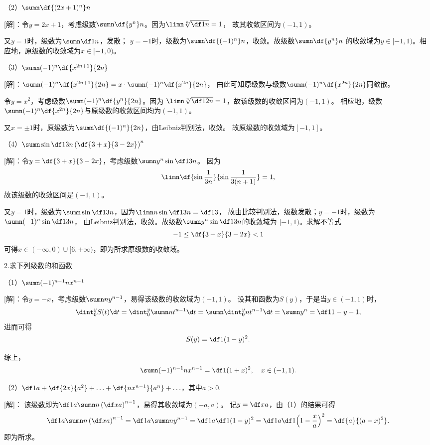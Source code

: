 （2）$\sumn\df{(2x+1)^n}n$

[解]：令$y=2x+1$，考虑级数$\sumn\df{y^n}n$。因为$\limn\sqrt[n]{\df1n}=1$，
故其收敛区间为$(-1,1)$。

又$y=1$时，级数为$\sumn\df1n$，发散；
$y=-1$时，级数为$\sumn\df{(-1)^n}n$，收敛。故级数$\sumn\df{y^n}n$
的收敛域为$y\in[-1,1)$。相应地，原级数的收敛域为$x\in[-1,0)$。

（3）$\sumn(-1)^n\df{x^{2n+1}}{2n}$

[解]：$\sumn(-1)^n\df{x^{2n+1}}{2n}=x\cdot\sumn(-1)^n\df{x^{2n}}{2n}$，
由此可知原级数与级数$\sumn(-1)^n\df{x^{2n}}{2n}$同敛散。

令$y=x^2$，考虑级数$\sumn(-1)^n\df{y^{n}}{2n}$。因为
$\limn\sqrt[n]{\df1{2n}}=1$，故该级数的收敛区间为$(-1,1)$。
相应地，级数$\sumn(-1)^n\df{x^{2n}}{2n}$与原级数的收敛区间均为$(-1,1)$。

又$x=\pm1$时，原级数为$\sumn\df{(-1)^n}{2n}$，由Leibniz判别法，收敛。
故原级数的收敛域为$[-1,1]$。

（4）$\sumn\sin\df 1 {3n}\left(\df{3+x}{3-2x}\right)^n$

[解]：令$y=\df{3+x}{3-2x}$，考虑级数$\sumn y^n\sin\df1{3n}$。
因为
$$\limn\df{\sin\frac1{3n}}{\sin\frac1{3(n+1)}}=1,$$
故该级数的收敛区间是$(-1,1)$。

又$y=1$时，级数为$\sumn\sin\df1{3n}$，因为$\limn n\sin\df1{3n}=\df13$，
故由比较判别法，级数发散；$y=-1$时，级数为$\sumn(-1)^n\sin\df1{3n}$，
由Leibniz判别法，收敛。故级数$\sumn y^n\sin\df1{3n}$的收敛域为
$[-1,1)$。求解不等式
$$-1\leq\df{3+x}{3-2x}<1$$
可得$x\in(-\infty,0)\cup[6,+\infty)$，即为所求原级数的收敛域。\fin

\bs

2.求下列级数的和函数

（1）$\sumn(-1)^{n-1}nx^{n-1}$

[解]：令$y=-x$，考虑级数$\sumn ny^{n-1}$，易得该级数的收敛域为$(-1,1)$。
设其和函数为$S(y)$，于是当$y\in(-1,1)$时，
$$\dint_0^yS(t)\d t=\dint_0^y\sumn nt^{n-1}\d t
=\sumn \dint_0^ynt^{n-1}\d t=\sumn y^n=\df1{1-y}-1,$$
进而可得
$$S(y)=\df1{(1-y)^2}.$$

综上，
$$\sumn(-1)^{n-1}nx^{n-1}=\df1{(1+x)^2},\quad x\in(-1,1).$$

（2）$\df1a+\df{2x}{a^2}+\ldots+\df{nx^{n-1}}{a^n}+\ldots$，其中$a>0$.

[解]：
该级数即为$\df1a\sumn n\left(\df xa\right)^{n-1}$，易得其收敛域为$(-a,a)$。
记$y=\df xa$，由（1）的结果可得
$$\df1a\sumn n\left(\df xa\right)^{n-1}
=\df1a\sumn ny^{n-1}=\df1a\df1{(1-y)^2}=\df1a\df1{\left(1-\frac xa\right)^2}
=\df{a}{(a-x)^2}.$$
即为所求。


